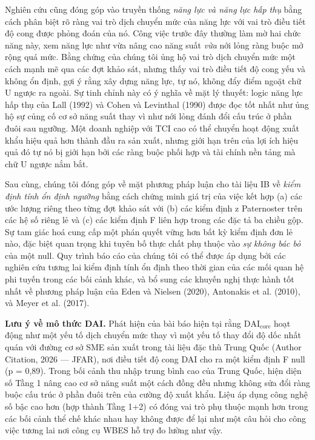 \documentclass[12pt,a4paper]{article}
\begin{document}
Nghiên cứu cũng đóng góp vào truyền thống \emph{năng lực và năng lực hấp
thụ} bằng cách phân biệt rõ ràng vai trò dịch chuyển mức của năng lực
với vai trò điều tiết độ cong được phỏng đoán của nó. Công việc trước
đây thường làm mờ hai chức năng này, xem năng lực như vừa nâng cao năng
suất \emph{vừa} nới lỏng ràng buộc mở rộng quá mức. Bằng chứng của chúng
tôi ủng hộ vai trò dịch chuyển mức một cách mạnh mẽ qua các đợt khảo
sát, nhưng thấy vai trò điều tiết độ cong yếu và không ổn định, gợi ý
rằng xây dựng năng lực, tự nó, không đẩy điểm ngoặt chữ U ngược ra
ngoài. Sự tinh chỉnh này có ý nghĩa về mặt lý thuyết: logic năng lực hấp
thụ của Lall (1992) và Cohen và Levinthal (1990) được đọc tốt nhất như
ủng hộ sự củng cố cơ sở năng suất thay vì như nới lỏng đánh đổi cấu trúc
ở phần đuôi sau ngưỡng. Một doanh nghiệp với TCI cao có thể chuyển hoạt
động xuất khẩu hiệu quả hơn thành đầu ra sản xuất, nhưng giới hạn trên
của lợi ích hiệu quả đó tự nó bị giới hạn bởi các ràng buộc phối hợp và
tài chính nền tảng mà chữ U ngược nắm bắt.

Sau cùng, chúng tôi đóng góp về mặt phương pháp luận cho tài liệu IB về
\emph{kiểm định tính ổn định ngưỡng} bằng cách chứng minh giá trị của
việc kết hợp (a) các ước lượng riêng theo từng đợt khảo sát với (b) các
kiểm định z Paternoster trên các hệ số riêng lẻ và (c) các kiểm định F
liên hợp trong các đặc tả ba chiều gộp. Sự tam giác hoá cung cấp một
phán quyết vững hơn bất kỳ kiểm định đơn lẻ nào, đặc biệt quan trọng khi
tuyên bố thực chất phụ thuộc vào \emph{sự không bác bỏ} của một null.
Quy trình báo cáo của chúng tôi có thể được áp dụng bởi các nghiên cứu
tương lai kiểm định tính ổn định theo thời gian của các mối quan hệ phi
tuyến trong các bối cảnh khác, và bổ sung các khuyến nghị thực hành tốt
nhất về phương pháp luận của Eden và Nielsen (2020), Antonakis et al.
(2010), và Meyer et al. (2017).

\textbf{Lưu ý về mô thức DAI.} Phát hiện của bài báo hiện tại rằng
\(\mathrm{DAI}_{\text{core}}\) hoạt động như một yếu tố dịch chuyển mức
thay vì một yếu tố thay đổi độ dốc nhất quán với đường cơ sở SME sản
xuất trong tài liệu đặc thù Trung Quốc (Author Citation, 2026 --- JFAR),
nơi điều tiết độ cong DAI cho ra một kiểm định F null (p = 0,89). Trong
bối cảnh thu nhập trung bình cao của Trung Quốc, hiện diện số Tầng 1
nâng cao cơ sở năng suất một cách đồng đều nhưng không sửa đổi ràng buộc
cấu trúc ở phần đuôi trên của cường độ xuất khẩu. Liệu áp dụng công nghệ
số bậc cao hơn (hợp thành Tầng 1+2) có đóng vai trò phụ thuộc mạnh hơn
trong các bối cảnh thể chế khác nhau hay không được để lại như một câu
hỏi cho công việc tương lai nơi công cụ WBES hỗ trợ đo lường như vậy.
\end{document}

